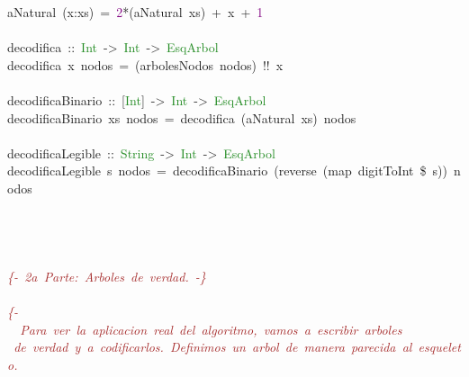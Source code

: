 \begin{allintypewriter}
\mbox{}aNatural\ \textcolor{BrickRed}{(}x\textcolor{BrickRed}{:}xs\textcolor{BrickRed}{)}\ \textcolor{BrickRed}{=}\ \textcolor{Purple}{2}\textcolor{BrickRed}{*(}aNatural\ xs\textcolor{BrickRed}{)}\ \textcolor{BrickRed}{+}\ x\ \textcolor{BrickRed}{+}\ \textcolor{Purple}{1} \\
\mbox{} \\
\mbox{}decodifica\ \textcolor{BrickRed}{::}\ \textcolor{ForestGreen}{Int}\ \textcolor{BrickRed}{-\textgreater{}}\ \textcolor{ForestGreen}{Int}\ \textcolor{BrickRed}{-\textgreater{}}\ \textcolor{ForestGreen}{EsqArbol} \\
\mbox{}decodifica\ x\ nodos\ \textcolor{BrickRed}{=}\ \textcolor{BrickRed}{(}arbolesNodos\ nodos\textcolor{BrickRed}{)}\ \textcolor{BrickRed}{!!}\ x\  \\
\mbox{} \\
\mbox{}decodificaBinario\ \textcolor{BrickRed}{::}\ \textcolor{BrickRed}{[}\textcolor{ForestGreen}{Int}\textcolor{BrickRed}{]}\ \textcolor{BrickRed}{-\textgreater{}}\ \textcolor{ForestGreen}{Int}\ \textcolor{BrickRed}{-\textgreater{}}\ \textcolor{ForestGreen}{EsqArbol} \\
\mbox{}decodificaBinario\ xs\ nodos\ \textcolor{BrickRed}{=}\ decodifica\ \textcolor{BrickRed}{(}aNatural\ xs\textcolor{BrickRed}{)}\ nodos\ \  \\
\mbox{} \\
\mbox{}decodificaLegible\ \textcolor{BrickRed}{::}\ \textcolor{ForestGreen}{String}\ \textcolor{BrickRed}{-\textgreater{}}\ \textcolor{ForestGreen}{Int}\ \textcolor{BrickRed}{-\textgreater{}}\ \textcolor{ForestGreen}{EsqArbol} \\
\mbox{}decodificaLegible\ s\ nodos\ \textcolor{BrickRed}{=}\ decodificaBinario\ \textcolor{BrickRed}{(}reverse\ \textcolor{BrickRed}{(}map\ digitToInt\ \textcolor{BrickRed}{\$}\ s\textcolor{BrickRed}{))}\ nodos \\
\mbox{} \\
\mbox{}\ \  \\
\mbox{} \\
\mbox{} \\
\mbox{}\textit{\textcolor{Brown}{\{-\ 2a\ Parte:\ Arboles\ de\ verdad.\ -\}}} \\
\mbox{} \\
\mbox{}\textit{\textcolor{Brown}{\{-}} \\
\mbox{}\textit{\textcolor{Brown}{\ \ Para\ ver\ la\ aplicacion\ real\ del\ algoritmo,\ vamos\ a\ escribir\ arboles}} \\
\mbox{}\textit{\textcolor{Brown}{\ de\ verdad\ y\ a\ codificarlos.\ Definimos\ un\ arbol\ de\ manera\ parecida\ al\ esqueleto.}} \\

\end{allintypewriter}
